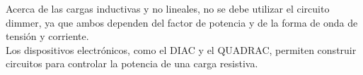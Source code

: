 \documentclass[journal]{IEEEtran}
\begin{document}
Acerca de las cargas inductivas y no lineales, no se 
debe utilizar el circuito dimmer, ya que ambos dependen 
del factor de potencia y de la forma de onda de tensión 
y corriente. \\

Los dispositivos electrónicos, como el DIAC y el QUADRAC, 
permiten construir circuitos para controlar la potencia 
de una carga resistiva.

\end{document}
